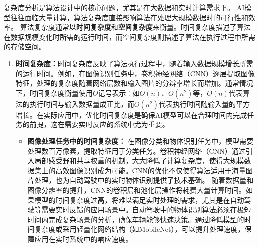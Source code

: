 
复杂度分析是算法设计中的核心问题，尤其是在大数据和实时计算需求下。
AI模型往往面临大量计算，算法复杂度直接影响算法在处理大规模数据时的可行性和效率。
算法复杂度通常以{\bf 时间复杂度}和{\bf 空间复杂度}来衡量。时间复杂度描述了算法在数据规模变化时所需的运行时间，而空间复杂度则描述了算法在执行过程中所需的存储空间。
\begin{enumerate}
\item {\bf 时间复杂度：}时间复杂度反映了算法执行过程中，随着输入数据规模增长所需的运行时间。例如，在图像识别任务中，卷积神经网络（CNN）逐层提取图像特征，处理的复杂度随着网络层数和输入图片的分辨率增长而增加。通常情况下，时间复杂度衡量使用$O$记号表示：如$O(n)$、$O(n^2)$等，$O(n)$代表算法的执行时间与输入数据量成正比，而$O(n^2)$代表执行时间随输入量的平方增长。在实际应用中，优化时间复杂度是确保AI模型可以在合理时间内完成任务的前提，这在需要实时反应的系统中尤为重要。
\begin{itemize}
\item {\bf 图像处理任务中的时间复杂度：} 在图像分类和物体识别任务中，模型需要处理数百万像素，提取特征用于分类任务。卷积神经网络（CNN）通过引入局部感受野和共享权重的机制，大大降低了计算复杂度，使得大规模数据集上的高效图像识别成为可能。CNN的优化不仅使得算法适用于海量图片处理，也为自动驾驶中的实时物体识别提供了技术基础。
随着数据量和图像分辨率的提升，CNN的卷积层和池化层操作将耗费大量计算时间。如果模型的时间复杂度过高，将难以满足实时处理的需求，尤其是在自动驾驶等需要实时反馈的应用场景中。自动驾驶中的物体识别算法必须在极短时间内完成复杂场景的分析，确保车辆能够快速决策。通过降低模型的时间复杂度或采用轻量化网络结构（如MobileNet），可以提升处理速度，保障应用在实时系统中的响应速度。



\end{itemize}
\end{enumerate}
